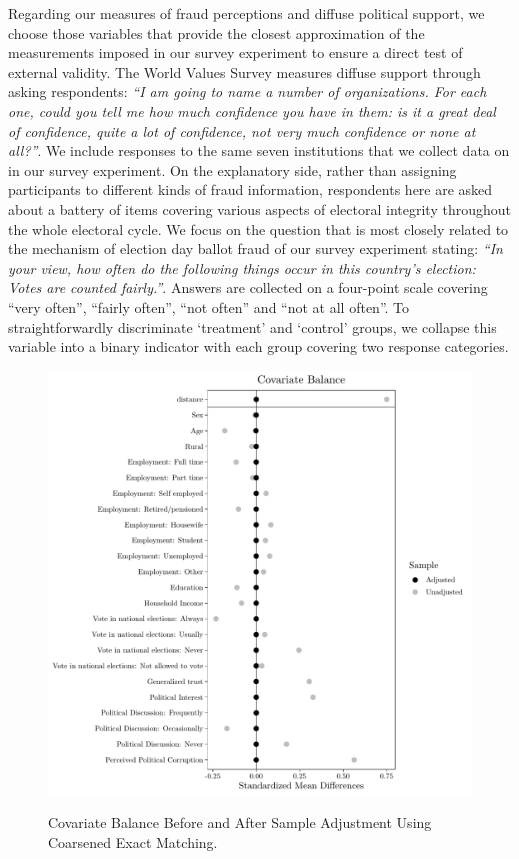 \documentclass[11pt, ngerman,english,a4]{article}
\begin{document}
Regarding our measures of fraud perceptions and diffuse political support, we choose those variables that provide the closest approximation of the measurements imposed in our survey experiment to ensure a direct test of external validity. The World Values Survey measures diffuse support through asking respondents: \textit{“I am going to name a number of organizations. For each one, could you tell me how much confidence you have in them: is it a great deal of confidence, quite a lot of confidence, not very much confidence or none at all?”}. We include responses to the same seven institutions that we collect data on in our survey experiment. On the explanatory side, rather than assigning participants to different kinds of fraud information, respondents here are asked about a battery of items covering various aspects of electoral integrity throughout the whole electoral cycle. We focus on the question that is most closely related to the mechanism of election day ballot fraud of our survey experiment stating: \textit{“In your view, how often do the following things occur in this country's election: Votes are counted fairly.”}. Answers are collected on a four-point scale covering “very often”, “fairly often”, “not often” and “not at all often”. To straightforwardly discriminate `treatment' and `control' groups, we collapse this variable into a binary indicator with each group covering two response categories.  

\begin{figure}[H]
    \caption{Covariate Balance Before and After Sample Adjustment Using Coarsened Exact Matching.}
    \centering
    \includegraphics[width=0.9\linewidth]{covbalance_cem.pdf}
    \label{fig:balance}
\end{figure}
\end{document}
